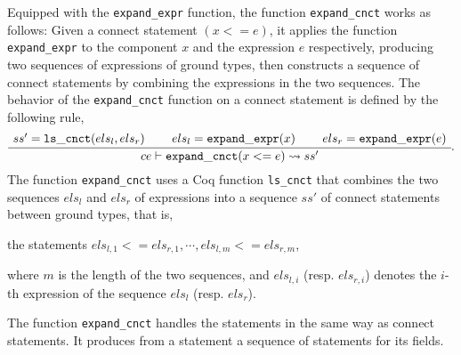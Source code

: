 {Equipped with the {\tt expand\_expr} function, the function {\tt expand\_cnct} works as follows: Given a connect statement $(x <= e)$, it applies
the function {\tt expand\_expr} to the component $x$ and the expression $e$ respectively, producing two sequences of expressions of ground types, then constructs a sequence of connect statements by combining the expressions in the two sequences. The behavior of the {\tt expand\_cnct} function on a connect statement is defined by the following rule,
  \begin{gather*}
  \label{expand-cnct}
    \inferiii[]
    {\seqq{ce\vdash{\tt expand\_cnct} (x <= e) \rightsquigarrow ss'}}
    {\seqq{ ss' = {\tt ls\_cnct}(els_l, els_r)}}
    {\seqq{els_l = {\tt expand\_expr}(x)}}
    {\seqq{els_r = {\tt expand\_expr}(e)}}.
    \end{gather*}
The function {\tt expand\_cnct} uses a Coq function {\tt ls\_cnct} that combines the two sequences $els_l$ and $els_r$ of expressions into a sequence $ss'$ of connect statements between ground types, that is,
\begin{center}
the statements $els_{l, 1} <= els_{r, 1}, \cdots, els_{l, m} <= els_{r, m}$,
\end{center}
 where $m$ is the length of the two sequences, and $els_{l, i}$ (resp. $els_{r, i}$) denotes the $i$-th expression of the sequence $els_l$ (resp. $els_r$).

The function {\tt expand\_cnct} handles the  statements in the same way as connect statements. It produces from a  statement
 a sequence of  statements for its fields.
 }

